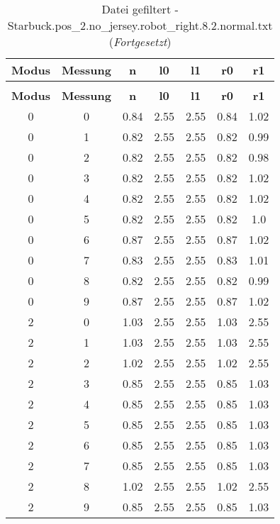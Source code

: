\clearpage{}
\begin{longtable}{|c|c||c||c|c||c|c|}
	\caption{Datei gefiltert - Starbuck.pos\_2.no\_jersey.robot\_right.8.2.normal.txt} \label{tab:Starbuck.pos-2.no-jersey.robot-right.8.2.normal.txt} \\ \hline
	\textbf{Modus} & \textbf{Messung} & \textbf{n} & \textbf{l0} & \textbf{l1} & \textbf{r0} & \textbf{r1}\\ \hline
	\endfirsthead
	\caption[]{Datei gefiltert - Starbuck.pos\_2.no\_jersey.robot\_right.8.2.normal.txt (\emph{Fortgesetzt})} \\ \hline
	\textbf{Modus} & \textbf{Messung} & \textbf{n} & \textbf{l0} & \textbf{l1} & \textbf{r0} & \textbf{r1}\\ \hline
	\endhead
	0 & 0 & 0.84 & 2.55 & 2.55 & 0.84 & 1.02 \\ \hline
	0 & 1 & 0.82 & 2.55 & 2.55 & 0.82 & 0.99 \\ \hline
	0 & 2 & 0.82 & 2.55 & 2.55 & 0.82 & 0.98 \\ \hline
	0 & 3 & 0.82 & 2.55 & 2.55 & 0.82 & 1.02 \\ \hline
	0 & 4 & 0.82 & 2.55 & 2.55 & 0.82 & 1.02 \\ \hline
	0 & 5 & 0.82 & 2.55 & 2.55 & 0.82 & 1.0 \\ \hline
	0 & 6 & 0.87 & 2.55 & 2.55 & 0.87 & 1.02 \\ \hline
	0 & 7 & 0.83 & 2.55 & 2.55 & 0.83 & 1.01 \\ \hline
	0 & 8 & 0.82 & 2.55 & 2.55 & 0.82 & 0.99 \\ \hline
	0 & 9 & 0.87 & 2.55 & 2.55 & 0.87 & 1.02 \\ \hline
	2 & 0 & 1.03 & 2.55 & 2.55 & 1.03 & 2.55 \\ \hline
	2 & 1 & 1.03 & 2.55 & 2.55 & 1.03 & 2.55 \\ \hline
	2 & 2 & 1.02 & 2.55 & 2.55 & 1.02 & 2.55 \\ \hline
	2 & 3 & 0.85 & 2.55 & 2.55 & 0.85 & 1.03 \\ \hline
	2 & 4 & 0.85 & 2.55 & 2.55 & 0.85 & 1.03 \\ \hline
	2 & 5 & 0.85 & 2.55 & 2.55 & 0.85 & 1.03 \\ \hline
	2 & 6 & 0.85 & 2.55 & 2.55 & 0.85 & 1.03 \\ \hline
	2 & 7 & 0.85 & 2.55 & 2.55 & 0.85 & 1.03 \\ \hline
	2 & 8 & 1.02 & 2.55 & 2.55 & 1.02 & 2.55 \\ \hline
	2 & 9 & 0.85 & 2.55 & 2.55 & 0.85 & 1.03 \\ \hline

\end{longtable}
